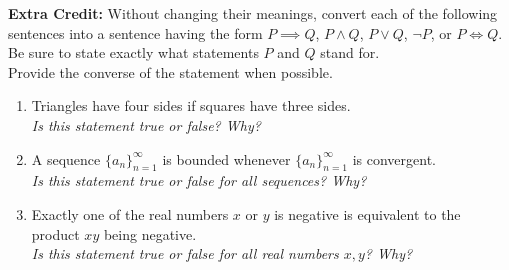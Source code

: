 \documentclass[11pt]{amsart}
\begin{document}
\underline{\hspace{6in}}
\vspace{.5in}

\noindent \textbf{Extra Credit:} Without changing their meanings, convert each of the following sentences into a sentence having the form $P\implies Q$, $P\wedge Q$, $P\vee Q$, $\neg P$, or $P\iff Q$. Be sure to state exactly what statements $P$ and $Q$ stand for. \\
Provide the converse of the statement when possible. 
\begin{enumerate}
\item Triangles have four sides if squares have three sides.\\
\emph{Is this statement true or false? Why?}

\item A sequence $\{a_n\}_{n=1}^\infty$ is bounded whenever $\{a_n\}_{n=1}^\infty$ is convergent.\\
\emph{Is this statement true or false for all sequences? Why?}

\item Exactly one of the real numbers $x$ or $y$ is negative is equivalent to the product $xy$ being negative.\\
\emph{Is this statement true or false for all real numbers $x,y$? Why?}
\end{enumerate}
\end{document}
